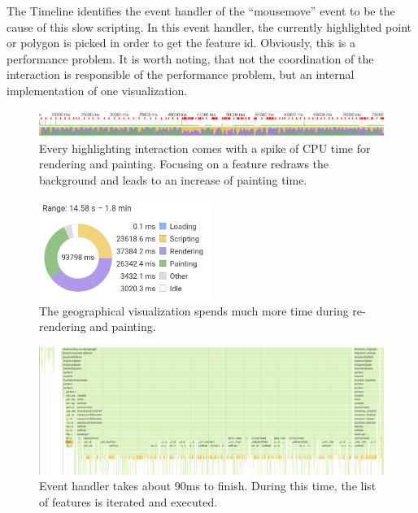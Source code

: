 The Timeline identifies the event handler of the ``mousemove'' event to be the cause of this slow scripting.
In this event handler, the currently highlighted point or polygon is picked in order to get the feature id.
Obviously, this is a performance problem.
It is worth noting, that not the coordination of the interaction is responsible of the performance problem, but an internal implementation of one visualization.

\begin{figure}[h]
  \centering
  \includegraphics[width=\textwidth]{figures/evaluation/performance/profiles/immoscout_both/fps}
  \caption{
    Every highlighting interaction comes with a spike of CPU time for rendering and painting.
    Focusing on a feature redraws the background and leads to an increase of painting time.
  }\label{fig:evaluation:performance:profiling:immoscout_both:fps}
\end{figure}

\begin{figure}[h]
  \centering
  \includegraphics[width=0.5\textwidth]{figures/evaluation/performance/profiles/immoscout_both/summary}
  \caption{
    The geographical visualization spends much more time during re-rendering and painting.
  }\label{fig:evaluation:performance:profiling:immoscout_both:summary}
\end{figure}

\begin{figure}[h]
  \centering
  \includegraphics[width=\textwidth]{figures/evaluation/performance/profiles/immoscout_both/callstack}
  \caption{
    Event handler  takes about 90ms to finish.
    During this time, the list of features is iterated and  executed.
  }\label{fig:evaluation:performance:profiling:immoscout_both:callstack}
\end{figure}

